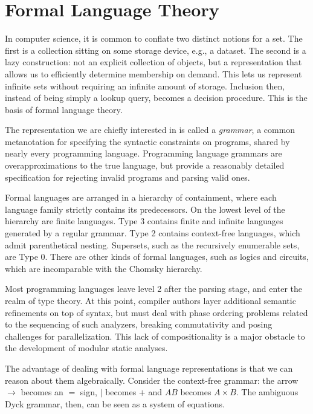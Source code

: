 \chapter{\rm\bfseries Formal Language Theory}
\label{ch:chapter01}

In computer science, it is common to conflate two distinct notions for a set. The first is a collection sitting on some storage device, e.g., a dataset. The second is a lazy construction: not an explicit collection of objects, but a representation that allows us to efficiently determine membership on demand. This lets us represent infinite sets without requiring an infinite amount of storage. Inclusion then, instead of being simply a lookup query, becomes a decision procedure. This is the basis of formal language theory.

The representation we are chiefly interested in is called a \textit{grammar}, a common metanotation for specifying the syntactic constraints on programs, shared by nearly every programming language. Programming language grammars are overapproximations to the true language, but provide a reasonably detailed specification for rejecting invalid programs and parsing valid ones.

Formal languages are arranged in a hierarchy of containment, where each language family strictly contains its predecessors. On the lowest level of the hierarchy are finite languages. Type 3 contains finite and infinite languages generated by a regular grammar. Type 2 contains context-free languages, which admit parenthetical nesting. Supersets, such as the recursively enumerable sets, are Type 0. There are other kinds of formal languages, such as logics and circuits, which are incomparable with the Chomsky hierarchy.

Most programming languages leave level 2 after the parsing stage, and enter the realm of type theory. At this point, compiler authors layer additional semantic refinements on top of syntax, but must deal with phase ordering problems related to the sequencing of such analyzers, breaking commutativity and posing challenges for parallelization. This lack of compositionality is a major obstacle to the development of modular static analyses.

The advantage of dealing with formal language representations is that we can reason about them algebraically. Consider the context-free grammar: the arrow $\rightarrow$ becomes an $=$ sign, $\mid$ becomes $+$ and $AB$ becomes $A \times B$. The ambiguous Dyck grammar, then, can be seen as a system of equations.

